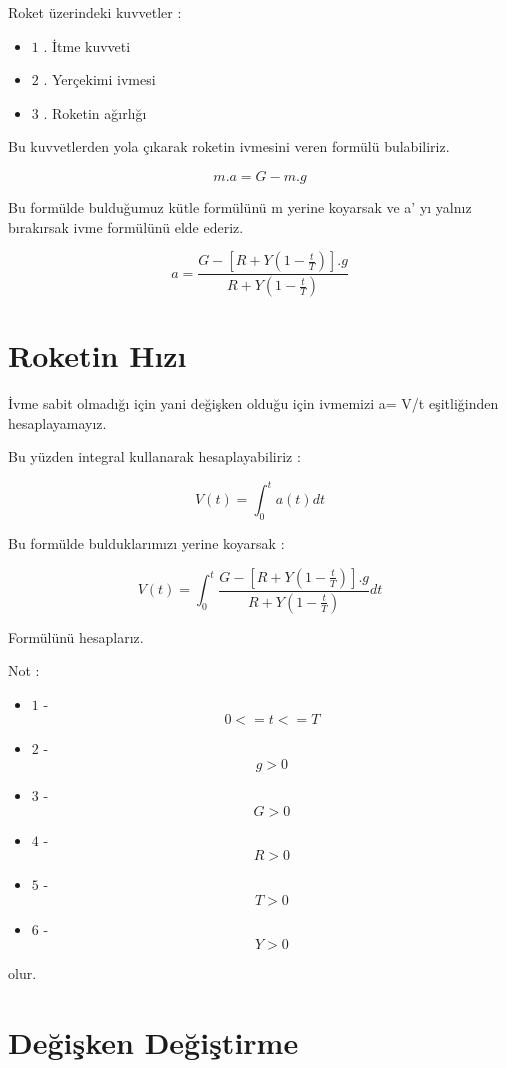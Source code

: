 \documentclass[a4paper,10pt]{article}
\begin{document}
Roket üzerindeki kuvvetler : 

\begin{itemize}
\item $1$ . İtme kuvveti
  
\item $2$ . Yerçekimi ivmesi 

\item $3$ .  Roketin ağırlığı

\end{itemize}

Bu kuvvetlerden yola çıkarak roketin ivmesini veren formülü bulabiliriz.

\[
 m.a = G - m.g
\]


Bu formülde bulduğumuz kütle formülünü m yerine koyarsak ve a' yı yalnız bırakırsak ivme formülünü elde ederiz.


\[
a = \frac {G - [ R + Y ( 1 - \frac{t}{T} ) ].g }{R + Y ( 1 - \frac{t}{T})}
\]


\section{Roketin Hızı}

İvme sabit olmadığı için yani değişken olduğu için ivmemizi a= V/t eşitliğinden hesaplayamayız.


Bu yüzden integral kullanarak hesaplayabiliriz :

\[
 V(t) = \int_0^t a(t)dt 
\]

Bu formülde bulduklarımızı yerine koyarsak :

\[
 V(t) = \int_0^t\frac{G - [R + Y (1 - \frac{t}{T})].g}{R + Y (1 - \frac{t}{T} )}dt
\]


Formülünü hesaplarız.

Not :
 \begin{itemize}
  \item $1$ - \[0 <= t <= T\]
  \item $2$ - \[ g > 0\]
  \item $3$ - \[G > 0 \]
  \item $4$ - \[R > 0 \]
  \item $5$ - \[T > 0 \]
  \item $6$ - \[Y > 0\]

  \end{itemize}
    
    olur.

\section{Değişken Değiştirme}
\end{document}
